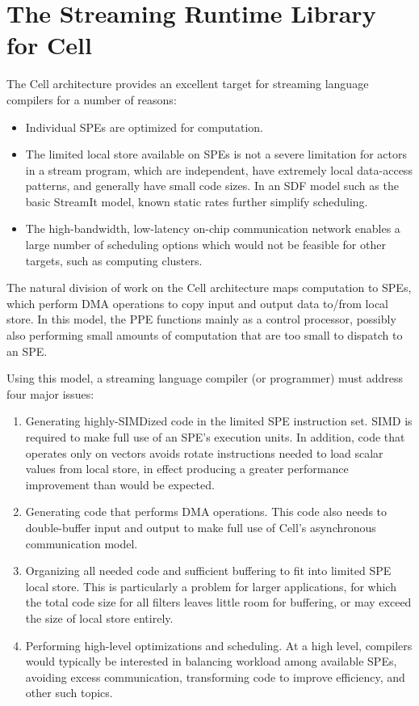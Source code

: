 \chapter{The Streaming Runtime Library for Cell}\label{ch:lib}

The Cell architecture provides an excellent target for streaming language compilers for a number of reasons:
\begin{itemize}
\item Individual SPEs are optimized for computation.
\item The limited local store available on SPEs is not a severe limitation for actors in a stream program, which are independent, have extremely local data-access patterns, and generally have small code sizes. In an SDF model such as the basic StreamIt model, known static rates further simplify scheduling.
\item The high-bandwidth, low-latency on-chip communication network enables a large number of scheduling options which would not be feasible for other targets, such as computing clusters.
\end{itemize}

The natural division of work on the Cell architecture maps computation to SPEs, which perform DMA operations to copy input and output data to/from local store. In this model, the PPE functions mainly as a control processor, possibly also performing small amounts of computation that are too small to dispatch to an SPE.

Using this model, a streaming language compiler (or programmer) must address four major issues:
\begin{enumerate}
\item Generating highly-SIMDized code in the limited SPE instruction set. SIMD is required to make full use of an SPE's execution units. In addition, code that operates only on vectors avoids rotate instructions needed to load scalar values from local store, in effect producing a greater performance improvement than would be expected.
\item Generating code that performs DMA operations. This code also needs to double-buffer input and output to make full use of Cell's asynchronous communication model.
\item Organizing all needed code and sufficient buffering to fit into limited SPE local store. This is particularly a problem for larger applications, for which the total code size for all filters leaves little room for buffering, or may exceed the size of local store entirely.
\item Performing high-level optimizations and scheduling. At a high level, compilers would typically be interested in balancing workload among available SPEs, avoiding excess communication, transforming code to improve efficiency, and other such topics.
\end{enumerate}

